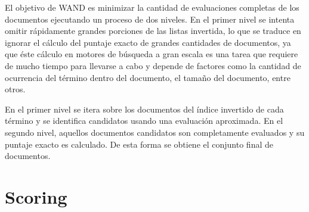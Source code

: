 El objetivo de WAND es minimizar la cantidad de evaluaciones completas de los documentos ejecutando un proceso de dos niveles. En el primer nivel se intenta omitir rápidamente grandes porciones de las listas invertida, lo que se traduce en ignorar el cálculo del puntaje exacto de grandes cantidades de documentos, ya que éste cálculo en motores de búsqueda a gran escala es una tarea que requiere de mucho tiempo para llevarse a cabo y depende de factores como la cantidad de ocurrencia del término dentro del documento, el tamaño del documento, entre otros.  

En el primer nivel se itera sobre los documentos del índice invertido de cada término y se identifica candidatos usando una evaluación aproximada. En el segundo nivel, aquellos documentos candidatos son completamente evaluados y su puntaje exacto es calculado. De esta forma se obtiene el conjunto final de documentos.



\section{Scoring}
\label{marco:scoring}

